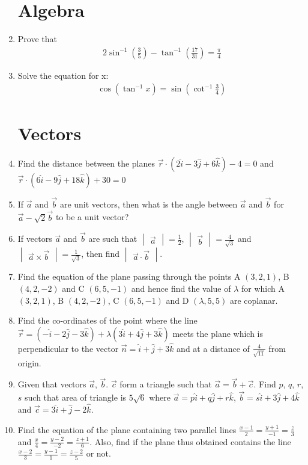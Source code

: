 \documentclass[12pt,-letter paper]{article}
\providecommand{\brak}[1]{\ensuremath{\left(#1\right)}}
\theoremstyle{remark}
\newcommand{\mydet}[1]{\ensuremath{\begin{vmatrix}#1\end{vmatrix}}}
\begin{document}
\begin{enumerate}
\section{Algebra}
\item Prove that 
\begin{align*}
2\sin^{-1}\brak{\frac{3}{5}}-\tan^{-1}\brak{\frac{17}{31}} = \frac{\pi}{4}
\end{align*}
\item Solve the equation for x:
\begin{align*}
\cos\brak{\tan^{-1}x} = \sin\brak{\cot^{-1}\frac{3}{4}}
\end{align*}
\section{Vectors}
\item Find the distance between the planes $\overrightarrow{r} \cdot \brak{2\hat{i} - 3\hat{j} + 6\hat{k}} - 4 = 0$ and $\overrightarrow{r} \cdot \brak{6\hat{i} - 9\hat{j} + 18\hat{k}} + 30 = 0$
\item If $\overrightarrow{a}$ and $\overrightarrow{b}$ are unit vectors, then what is the angle between $\overrightarrow{a}$ and $\overrightarrow{b}$ for $\overrightarrow{a} - \sqrt{2}\overrightarrow{b}$ to be a unit vector?
\item If vectors $\overrightarrow{a}$ and $\overrightarrow{b}$ are such that $\mydet{\overrightarrow{a}} = \frac{1}{2}$, $\mydet{\overrightarrow{b}} = \frac{4}{\sqrt{3}}$ and $\mydet{\overrightarrow{a}\times \overrightarrow{b}} = \frac{1}{\sqrt{3}}$, then find $\mydet{\overrightarrow{a} \cdot \overrightarrow{b}}$.
\item Find the equation of the plane passing through the points A $\brak{3, 2, 1}$, B $\brak{4, 2, -2}$ and C $\brak{6, 5, -1}$ and hence find the value of $\lambda$ for which A $\brak{3, 2, 1}$, B $\brak{4, 2, -2}$, C $\brak{6, 5, -1}$ and D $\brak{\lambda, 5, 5}$ are coplanar.
\item Find the co-ordinates of the point where the line $\overrightarrow{r} = \brak{-\hat{i}-2\hat{j}-3\hat{k}} + \lambda \brak{3\hat{i}+4\hat{j}+3\hat{k}}$ meets the plane which is perpendicular to the vector $\overrightarrow{n} = \hat{i} + \hat{j} + 3\hat{k}$ and at a distance of $\frac{4}{\sqrt{11}}$ from origin. 
\item Given that vectors $\overrightarrow{a}$, $\overrightarrow{b}$. $\overrightarrow{c}$ form a triangle such that $\overrightarrow{a} = \overrightarrow{b} + \overrightarrow{c}$. Find $p$, $q$, $r$, $s$ such that area of triangle is $5\sqrt{6}$ where $\overrightarrow{a} = p\hat{i} + q\hat{j} + r\hat{k}$, $\overrightarrow{b} = s\hat{i} + 3\hat{j} + 4\hat{k}$ and $\overrightarrow{c} = 3\hat{i} + \hat{j} - 2\hat{k}$.
\item Find the equation of the plane containing two parallel lines $\frac{x-1}{2} = \frac{y+1}{-1} = \frac{z}{3}$ and $\frac{x}{4} = \frac{y-2}{-2} = \frac{z+1}{6}$. Also, find if the plane thus obtained contains the line $\frac{x - 2}{3} = \frac{y - 1}{1} = \frac{z-2}{5}$ or not.

\end{enumerate}
\end{document}

